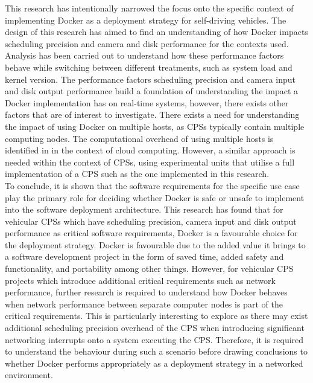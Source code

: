 This research has intentionally narrowed the focus onto the specific context of implementing Docker as a deployment strategy for self-driving vehicles. The design of this research has aimed to find an understanding of how Docker impacts scheduling precision and camera and disk performance for the contexts used. Analysis has been carried out to understand how these performance factors behave while switching between different treatments, such as system load and kernel version. The performance factors scheduling precision and camera input and disk output performance build a foundation of understanding the impact a Docker implementation has on real-time systems, however, there exists other factors that are of interest to investigate. There exists a need for understanding the impact of using Docker on multiple hosts, as CPSs typically contain multiple computing nodes. The computational overhead of using multiple hosts is identified in \cite{p1} in the context of cloud computing. However, a similar approach is needed within the context of CPSs, using experimental units that utilise a full implementation of a CPS such as the one implemented in this research.\\

To conclude, it is shown that the software requirements for the specific use case play the primary role for deciding whether Docker is safe or unsafe to implement into the software deployment architecture. This research has found that for vehicular CPSs which have scheduling precision, camera input and disk output performance as critical software requirements, Docker is a favourable choice for the deployment strategy. Docker is favourable due to the added value it brings to a software development project in the form of saved time, added safety and functionality, and portability among other things. However, for vehicular CPS projects which introduce additional critical requirements such as network performance, further research is required to understand how Docker behaves when network performance between separate computer nodes is part of the critical requirements. This is particularly interesting to explore as there may exist additional scheduling precision overhead of the CPS when introducing significant networking interrupts onto a system executing the CPS. Therefore, it is required to understand the behaviour during such a scenario before drawing conclusions to whether Docker performs appropriately as a deployment strategy in a networked environment.
